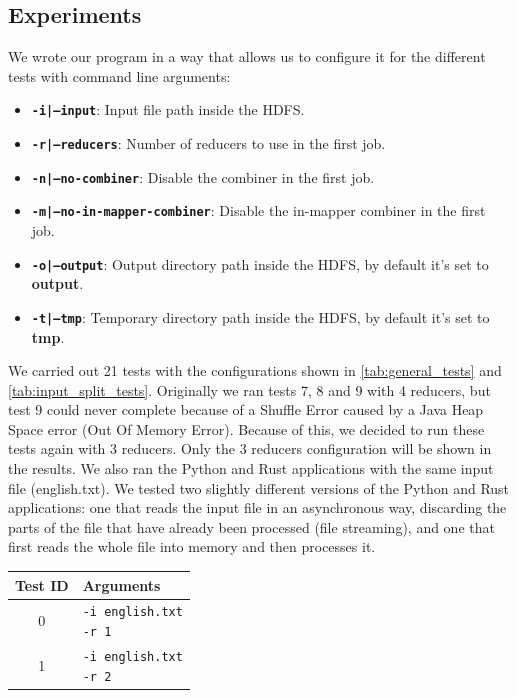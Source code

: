 \documentclass{article}
\begin{document}
\begin{multicols}{2}
\section{Experiments}
    We wrote our program in a way that allows us to configure it for the different tests with 
    command line arguments:
    \begin{itemize}
        \item \textbf{\texttt{-i|--input}}: Input file path inside the HDFS.
        \item \textbf{\texttt{-r|--reducers}}: Number of reducers to use in the first job.
        \item \textbf{\texttt{-n|--no-combiner}}: Disable the combiner in the first job.
        \item \textbf{\texttt{-m|--no-in-mapper-combiner}}: Disable the in-mapper combiner in the first job.
        \item \textbf{\texttt{-o|--output}}: Output directory path inside the HDFS, 
        by default it's set to \textbf{output}.
        \item \textbf{\texttt{-t|--tmp}}: Temporary directory path inside the HDFS,
        by default it's set to \textbf{tmp}.
    \end{itemize}
    We carried out 21 tests with the configurations shown in 
    \autoref{tab:general_tests} and \autoref{tab:input_split_tests}.
    Originally we ran tests 7, 8 and 9 with 4 reducers, but test 9 could never complete because of a 
    Shuffle Error caused by a Java Heap Space error (Out Of Memory Error). Because of this, 
    we decided to run these tests again with 3 reducers.
    Only the 3 reducers configuration will be shown in the results.
    We also ran the Python and Rust applications with the same input file (english.txt).
    We tested two slightly different versions of the Python and Rust applications: one that reads the
    input file in an asynchronous way, discarding the parts of the file that have already been processed (file streaming),
    and one that first reads the whole file into memory and then processes it.
    \begin{table}[H]
        \centering
        \capstart
        \begin{tabular}{|c|l|}
            \hline
            Test ID & Arguments \\
            \hline
            0 & \makecell[l]{\texttt{-i english.txt} \\ \texttt{-r 1}} \\        
            \hline
            1 & \makecell[l]{\texttt{-i english.txt} \\ \texttt{-r 2}} \\        

\end{tabular}
\end{table}
\end{multicols}
\end{document}
